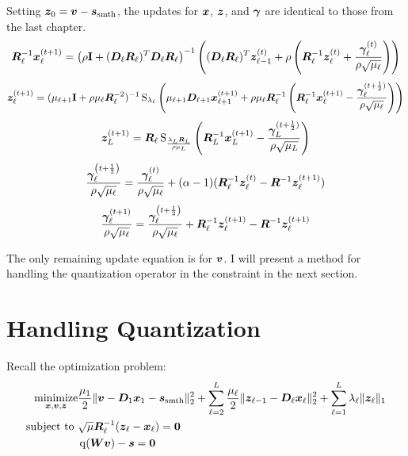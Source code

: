 Setting $\bm{z}_0 = \bm{v} - \bm{s}_{\text{smth}}$, the updates for $\bm{x}$, $\bm{z}$, and $\bm{\gamma}$ are identical to those from the last chapter.
%
\begin{equation} \label{equation:x-update JPEG}
\bm{R}_{\ell}^{-1}\bm{x}_{\ell}^{(t + 1)} = \left(\rho {\bf I} + (\bm{D}_{\ell}\bm{R}_{\ell})^T\bm{D}_{\ell}\bm{R}_{\ell}\right)^{-1}\left((\bm{D}_{\ell}\bm{R}_{\ell})^T\bm{z}_{\ell - 1}^{(t)} + \rho \left(\bm{R}_{\ell}^{-1}\bm{z}_{\ell}^{(t)} + \frac{\bm{\gamma}_{\ell}^{(t)}}{\rho\sqrt{\mu_{\ell}}}\right)\right)
\end{equation}
%
\begin{equation} \label{equation:z-update JPEG}
\bm{z}_{\ell}^{(t + 1)} = (\mu_{\ell + 1}{\bf I} + \rho\mu_{\ell}\bm{R}_{\ell}^{-2})^{-1}\operatorname{S}_{\lambda_{\ell}}\left(\mu_{\ell + 1}\bm{D}_{\ell + 1}\bm{x}_{\ell + 1}^{(t + 1)} + \rho\mu_{\ell}\bm{R}_{\ell}^{-1}\left(\bm{R}_{\ell}^{-1}\bm{x}_{\ell}^{(t + 1)} - \frac{\bm{\gamma}_{\ell}^{(t + \frac{1}{2})}}{\rho\sqrt{\mu_{\ell}}}\right)\right)
\end{equation}
%
\begin{equation}
\bm{z}_L^{(t + 1)} = \bm{R}_{\ell}\operatorname{S}_{\frac{\lambda_L\bm{R}_L}{\rho\mu_L}}\left(\bm{R}_L^{-1}\bm{x}_L^{(t + 1)} - \frac{\bm{\gamma}_L^{(t + \frac{1}{2})}}{\rho\sqrt{\mu_L}}\right)
\end{equation}
%
\begin{equation}
\frac{\bm{\gamma}_{\ell}^{\left(t + \frac{1}{2}\right)}}{\rho\sqrt{\mu_{\ell}}} = \frac{\bm{\gamma}_{\ell}^{(t)}}{\rho\sqrt{\mu_{\ell}}} + (\alpha - 1)(\bm{R}_{\ell}^{-1}\bm{z}_{\ell}^{(t)} - \bm{R}^{-1}\bm{z}_{\ell}^{(t + 1)})
\end{equation}
%
\begin{equation}
\frac{\bm{\gamma}_{\ell}^{(t + 1)}}{\rho\sqrt{\mu_{\ell}}} = \frac{\bm{\gamma}_{\ell}^{\left(t + \frac{1}{2}\right)}}{\rho\sqrt{\mu_{\ell}}} + \bm{R}_{\ell}^{-1}\bm{z}_{\ell}^{(t + 1)} - \bm{R}^{-1}\bm{z}_{\ell}^{(t + 1)} 
\end{equation}
%

The only remaining update equation is for $\bm{v}$. I will present a method for handling the quantization operator in the constraint in the next section.

\section{Handling Quantization}



Recall the optimization problem:
\begin{equation}
\begin{aligned}
\operatorname*{\text{minimize}}_{\bm{x},\bm{v},\bm{z}} & \frac{\mu_1}{2}\|\bm{v} - \bm{D}_1\bm{x}_1  - \bm{s}_{\text{smth}}\|_2^2 + \sum_{\ell = 2}^L \frac{\mu_{\ell}}{2}\|\bm{z}_{\ell - 1} - \bm{D}_{\ell}\bm{x}_{\ell}\|_2^2 + \sum_{\ell = 1}^L \lambda_{\ell}\|\bm{z}_{\ell}\|_1 \\
\text{subject to } & \sqrt{\mu}\bm{R}_{\ell}^{-1}(\bm{z}_{\ell} - \bm{x}_{\ell}) = \bm{0} \\
                   & \operatorname{q}(\bm{W}\bm{v}) - \bm{s} = \bm{0}
\end{aligned}
\end{equation}

